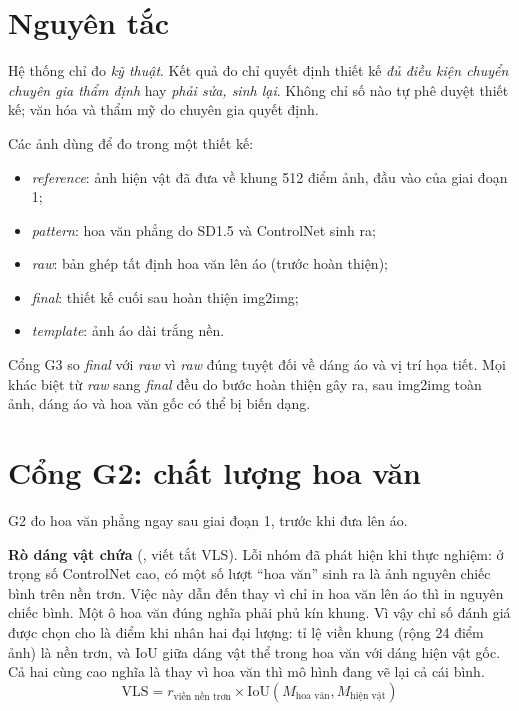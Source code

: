 \documentclass[12pt,a4paper]{report}
\newcommand{\ma}[1]{\texttt{\detokenize{#1}}}
\begin{document}
\section{Nguyên tắc}

Hệ thống chỉ đo \emph{kỹ thuật}. Kết quả đo chỉ quyết định thiết kế \emph{đủ điều kiện chuyển chuyên gia thẩm định} hay \emph{phải sửa, sinh lại}. Không chỉ số nào tự phê duyệt thiết kế; văn hóa và thẩm mỹ do chuyên gia quyết định.

Các ảnh dùng để đo trong một thiết kế:
\begin{itemize}
  \item \emph{reference}: ảnh hiện vật đã đưa về khung 512 điểm ảnh, đầu vào của giai đoạn 1;
  \item \emph{pattern}: hoa văn phẳng do SD1.5 và ControlNet sinh ra;
  \item \emph{raw}: bản ghép tất định hoa văn lên áo (trước hoàn thiện);
  \item \emph{final}: thiết kế cuối sau hoàn thiện img2img;
  \item \emph{template}: ảnh áo dài trắng nền.
\end{itemize}
Cổng G3 so \emph{final} với \emph{raw} vì \emph{raw} đúng tuyệt đối về dáng áo và vị trí họa tiết. Mọi khác biệt từ \emph{raw} sang \emph{final} đều do bước hoàn thiện gây ra, sau img2img toàn ảnh, dáng áo và hoa văn gốc có thể bị biến dạng.

\section{Cổng G2: chất lượng hoa văn}
\label{sec:g2}

G2 đo hoa văn phẳng ngay sau giai đoạn 1, trước khi đưa lên áo.

\textbf{Rò dáng vật chứa} (\ma{vessel_leakage}, viết tắt VLS). Lỗi nhóm đã phát hiện khi thực nghiệm: ở trọng số ControlNet cao, có một số lượt “hoa văn” sinh ra là ảnh nguyên chiếc bình trên nền trơn. Việc này dẫn đến thay vì chỉ in hoa văn lên áo thì in nguyên chiếc bình. Một ô hoa văn đúng nghĩa phải phủ kín khung. Vì vậy chỉ số đánh giá được chọn cho là điểm khi nhân hai đại lượng: tỉ lệ viền khung (rộng 24 điểm ảnh) là nền trơn, và IoU giữa dáng vật thể trong hoa văn với dáng hiện vật gốc. Cả hai cùng cao nghĩa là thay vì hoa văn thì mô hình đang vẽ lại cả cái bình.
\[
\mathrm{VLS}=r_{\text{viền nền trơn}}\times \mathrm{IoU}(M_{\text{hoa văn}},M_{\text{hiện vật}})
\]
\end{document}

